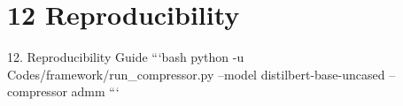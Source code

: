 \section{12 Reproducibility}

 12. Reproducibility Guide
```bash
python -u Codes/framework/run\_compressor.py --model distilbert-base-uncased --compressor admm
```
